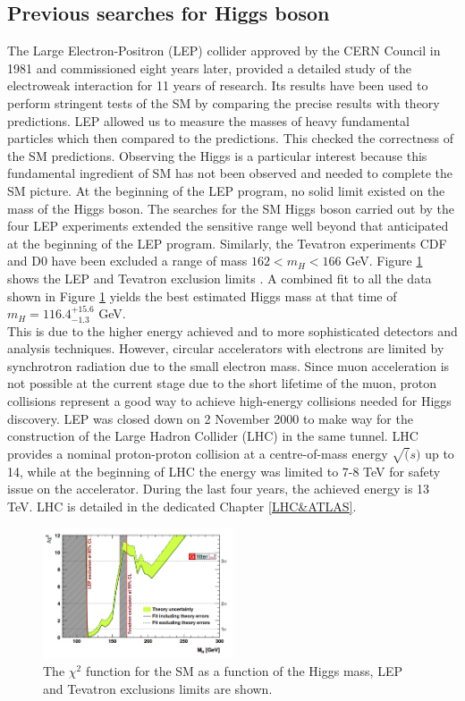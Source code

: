 \subsection{Previous searches for Higgs boson}

The Large Electron-Positron (LEP) collider approved by the CERN Council in 1981 and commissioned eight years later, provided a detailed study of the electroweak interaction for 11 years of research. Its results have been used to perform stringent tests of the SM by comparing the precise results with theory predictions. LEP allowed us to measure the masses of heavy fundamental particles which then compared to the predictions. This checked the correctness of the SM predictions. Observing the Higgs is a particular interest because this fundamental ingredient of SM has not been observed and needed to complete the SM picture. At the beginning of the LEP program, no solid limit existed on the mass of the Higgs boson. The searches for the SM Higgs boson carried out by the four LEP experiments extended the sensitive range well beyond that anticipated at the beginning of the LEP program. Similarly, the Tevatron experiments CDF and D0 have been excluded a range of mass $162 < m_{H} < 166$ GeV. Figure \ref{fig:chap1:H2012:LEP} shows the LEP and Tevatron exclusion limits \cite{LEP, Tevatron, LEP_Tevatron}. A combined fit to all the data shown in Figure \ref{fig:chap1:H2012:LEP} yields the best estimated Higgs mass at that time of $m_{H} = 116.4^{+15.6}_{-1.3}$ GeV. \\

This is due to the higher energy achieved and to more sophisticated detectors and analysis techniques. However, circular accelerators with electrons are limited by synchrotron radiation due to the small electron mass. Since muon acceleration is not possible at the current stage due to the short lifetime of the muon, proton collisions represent a good way to achieve high-energy collisions needed for Higgs discovery. LEP was closed down on 2 November 2000 to make way for the construction of the Large Hadron Collider (LHC) in the same tunnel. LHC provides a nominal proton-proton collision at a centre-of-mass energy $\sqrt(s)$ up to 14, while at the beginning of LHC the energy was limited to 7-8 TeV for safety issue on the accelerator. During the last four years, the achieved energy is 13 TeV. LHC is detailed in the dedicated Chapter \ref{LHC&ATLAS}. 
\begin{figure}[htbp]
    \centering
    \includegraphics[width=0.5\textwidth]{Ch1/Img/LEP_Tevatron_limits.png}
    \caption{The $\chi^2$ function for the SM as a function of the Higgs mass, LEP and Tevatron exclusions limits are shown.}
    \label{fig:chap1:H2012:LEP}
\end{figure}

